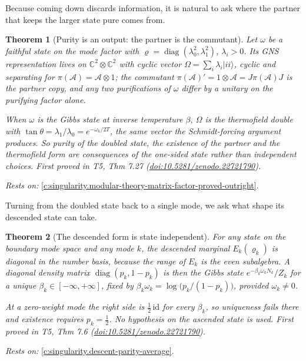 \documentclass[11pt]{article}
\newtheorem{theorem}{Theorem}[section]
\theoremstyle{definition}
\theoremstyle{plain}
\providecommand{\Aa}{}\renewcommand{\Aa}{\mathcal{A}}
\providecommand{\C}{}\renewcommand{\C}{\mathbb{C}}
\providecommand{\id}{}\renewcommand{\id}{\mathrm{id}}
\begin{document}
Because coming down discards information, it is natural to ask where the partner that keeps the larger state pure comes from.

\begin{theorem}[Purity is an output: the partner is the commutant]\label{c:singularity.purity-output-partner-commutant}
Let $\omega$ be a faithful state on the mode factor with $\varrho = \operatorname{diag}(\lambda_0^2, \lambda_1^2)$, $\lambda_i > 0$. Its GNS representation lives on $\C^2 \otimes \C^2$ with cyclic vector $\Omega = \sum_i \lambda_i |ii\rangle$, cyclic and separating for $\pi(\Aa) = \Aa \otimes 1$; the commutant $\pi(\Aa)' = 1 \otimes \Aa = J\pi(\Aa)J$ is the partner copy, and any two purifications of $\omega$ differ by a unitary on the purifying factor alone.

When $\omega$ is the Gibbs state at inverse temperature $\beta$, $\Omega$ is the thermofield double with $\tan\theta = \lambda_1/\lambda_0 = e^{-\omega_k/2T}$, the same vector the Schmidt-forcing argument produces. So purity of the doubled state, the existence of the partner and the thermofield form are consequences of the one-sided state rather than independent choices.
\emph{First proved in} T5, Thm 7.27 (\href{https://doi.org/10.5281/zenodo.22721790}{doi:10.5281/zenodo.22721790}).
\end{theorem}
\noindent\emph{Rests on:} \ref{c:singularity.modular-theory-matrix-factor-proved-outright}.

Turning from the doubled state back to a single mode, we ask what shape its descended state can take.

\begin{theorem}[The descended form is state independent]\label{c:singularity.descended-form-state-independent}
For any state on the boundary mode space and any mode $k$, the descended marginal $E_k(\varrho_k)$ is diagonal in the number basis, because the range of $E_k$ is the even subalgebra. A diagonal density matrix $\operatorname{diag}(p_k, 1 - p_k)$ is then the Gibbs state $e^{-\beta_k\omega_k N_k}/Z_k$ for a unique $\beta_k \in [-\infty, +\infty]$, fixed by $\beta_k\omega_k = \log\bigl(p_k/(1-p_k)\bigr)$, provided $\omega_k \neq 0$.

At a zero-weight mode the right side is $\tfrac12\,\id$ for every $\beta_k$, so uniqueness fails there and existence requires $p_k = \tfrac12$. No hypothesis on the ascended state is used.
\emph{First proved in} T5, Thm 7.6 (\href{https://doi.org/10.5281/zenodo.22721790}{doi:10.5281/zenodo.22721790}).
\end{theorem}
\noindent\emph{Rests on:} \ref{c:singularity.descent-parity-average}.
\end{document}
